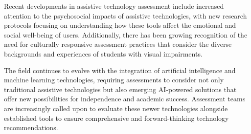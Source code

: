 Recent developments in assistive \gls{technology} assessment include increased attention to the psychosocial impacts of assistive technologies, with new research protocols focusing on understanding how these tools affect the emotional and social well-being of users. Additionally, there has been growing recognition of the need for culturally responsive assessment practices that consider the diverse backgrounds and experiences of students with visual impairments.

The field continues to evolve with the integration of artificial intelligence and machine learning technologies, requiring assessments to consider not only traditional assistive technologies but also emerging AI-powered solutions that offer new possibilities for independence and academic success. Assessment teams are increasingly called upon to evaluate these newer technologies alongside established tools to ensure comprehensive and forward-thinking technology recommendations.

